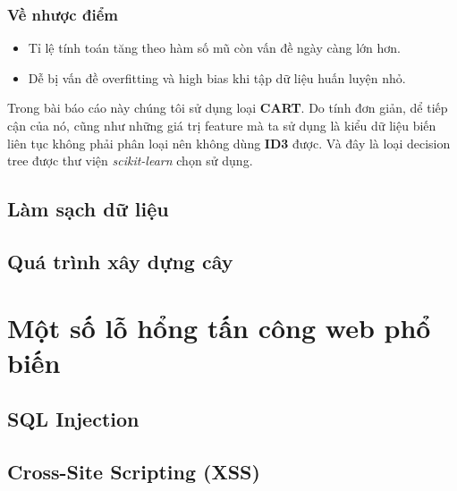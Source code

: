 \documentclass[../main-report.tex]{subfiles}
\begin{document}
\subsubsection*{Về nhược điểm}
\begin{itemize}
\item Tỉ lệ tính toán tăng theo hàm số mũ còn vấn đề ngày càng lớn hơn.
\item Dễ bị vấn đề overfitting và high bias khi tập dữ liệu huấn luyện nhỏ.
\end{itemize}

Trong bài báo cáo này chúng tôi sử dụng loại \textbf{CART}. Do tính đơn giản, dể tiếp cận của nó, cũng như những giá trị feature mà ta sử dụng là kiểu dữ liệu biến liên tục không phải phân loại nên không dùng \textbf{ID3} được. Và đây là loại decision tree được thư viện \textit{scikit-learn} chọn sử dụng.
\subsection{Làm sạch dữ liệu}

\subsection{Quá trình xây dựng cây}

\section[Một số lỗ hổng web]{Một số lỗ hổng tấn công web phổ biến}
\subsection{SQL Injection}

\subsection{Cross-Site Scripting (XSS)}
\end{document}

